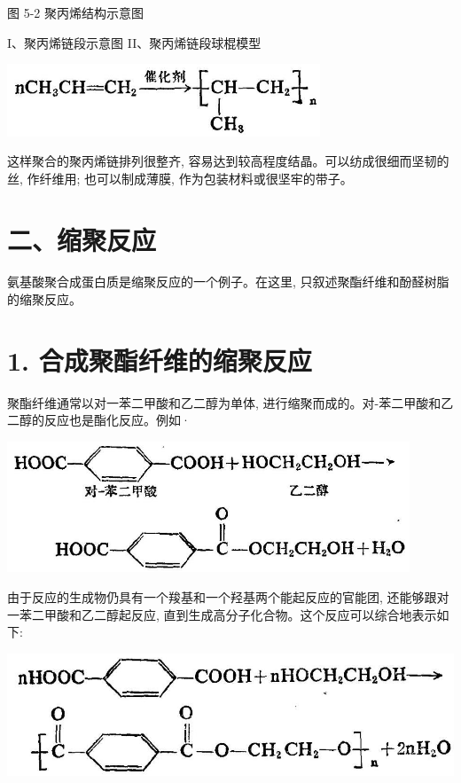 \documentclass[10pt]{article}
\begin{document}
图 5-2 聚丙烯结构示意图

I、聚丙烯链段示意图 II、聚丙烯链段球棍模型

\begin{center}
\includegraphics[max width=0.7\textwidth]{images/01912d16-be99-77bb-9535-4f3ed8d9946f_188_284586.jpg}
\end{center}

这样聚合的聚丙烯链排列很整齐, 容易达到较高程度结晶。可以纺成很细而坚韧的丝, 作纤维用; 也可以制成薄膜, 作为包装材料或很坚牢的带子。

\section*{二、缩聚反应}

氨基酸聚合成蛋白质是缩聚反应的一个例子。在这里, 只叙述聚酯纤维和酚醛树脂的缩聚反应。

\section*{1. 合成聚酯纤维的缩聚反应}

聚酯纤维通常以对一苯二甲酸和乙二醇为单体, 进行缩聚而成的。对-苯二甲酸和乙二醇的反应也是酯化反应。例如·

\begin{center}
\includegraphics[max width=0.9\textwidth]{images/01912d16-be99-77bb-9535-4f3ed8d9946f_188_683594.jpg}
\end{center}

由于反应的生成物仍具有一个羧基和一个羟基两个能起反应的官能团, 还能够跟对一苯二甲酸和乙二醇起反应, 直到生成高分子化合物。这个反应可以综合地表示如下:

\begin{center}
\includegraphics[max width=1.0\textwidth]{images/01912d16-be99-77bb-9535-4f3ed8d9946f_188_638761.jpg}
\end{center}
\end{document}
